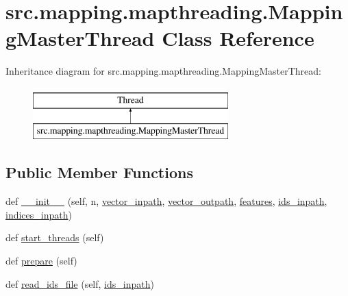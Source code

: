 \hypertarget{classsrc_1_1mapping_1_1mapthreading_1_1_mapping_master_thread}{}\section{src.\+mapping.\+mapthreading.\+Mapping\+Master\+Thread Class Reference}
\label{classsrc_1_1mapping_1_1mapthreading_1_1_mapping_master_thread}
Inheritance diagram for src.\+mapping.\+mapthreading.\+Mapping\+Master\+Thread\+:\begin{figure}[H]
\begin{center}
\leavevmode
\includegraphics[height=2.000000cm]{classsrc_1_1mapping_1_1mapthreading_1_1_mapping_master_thread}
\end{center}
\end{figure}
\subsection*{Public Member Functions}
\begin{DoxyCompactItemize}
\item 
def \hyperlink{classsrc_1_1mapping_1_1mapthreading_1_1_mapping_master_thread_a71b5c2e61bf13cffdcc0801a7f5a7121}{\+\_\+\+\_\+init\+\_\+\+\_\+} (self, n, \hyperlink{classsrc_1_1mapping_1_1mapthreading_1_1_mapping_master_thread_ad28cd816fab3ea85e9b7f9c105d306a2}{vector\+\_\+inpath}, \hyperlink{classsrc_1_1mapping_1_1mapthreading_1_1_mapping_master_thread_a38c9150229ea50de973f9f4ce2e6569f}{vector\+\_\+outpath}, \hyperlink{classsrc_1_1mapping_1_1mapthreading_1_1_mapping_master_thread_a57fe84be32a92ff596ca24b0a7de2324}{features}, \hyperlink{classsrc_1_1mapping_1_1mapthreading_1_1_mapping_master_thread_ac2d586e34cbeeeb50f653ad0cd0596fa}{ids\+\_\+inpath}, \hyperlink{classsrc_1_1mapping_1_1mapthreading_1_1_mapping_master_thread_a88fb8c0056df70baf0f4c3fa20d8807e}{indices\+\_\+inpath})
\item 
def \hyperlink{classsrc_1_1mapping_1_1mapthreading_1_1_mapping_master_thread_adba41bbaf55d33182698846fffb1883c}{start\+\_\+threads} (self)
\item 
def \hyperlink{classsrc_1_1mapping_1_1mapthreading_1_1_mapping_master_thread_ab0dd772e890149f3a961e81d4b9bdb83}{prepare} (self)
\item 
def \hyperlink{classsrc_1_1mapping_1_1mapthreading_1_1_mapping_master_thread_ab95b1d8a372ec75738a5ac67a7c752d6}{read\+\_\+ids\+\_\+file} (self, \hyperlink{classsrc_1_1mapping_1_1mapthreading_1_1_mapping_master_thread_ac2d586e34cbeeeb50f653ad0cd0596fa}{ids\+\_\+inpath})
\end{DoxyCompactItemize}
